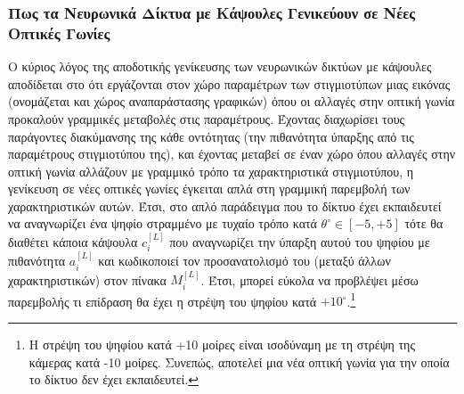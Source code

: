 \subsubsection{Πως τα Νευρωνικά Δίκτυα με Κάψουλες Γενικεύουν σε Νέες Οπτικές Γωνίες}
Ο κύριος λόγος της αποδοτικής γενίκευσης των νευρωνικών δικτύων με κάψουλες αποδίδεται στο ότι εργάζονται στον χώρο παραμέτρων των στιγμιοτύπων μιας εικόνας (ονομάζεται και χώρος αναπαράστασης γραφικών) όπου οι αλλαγές στην οπτική γωνία προκαλούν γραμμικές μεταβολές στις παραμέτρους. Έχοντας διαχωρίσει τους παράγοντες διακύμανσης της κάθε οντότητας (την πιθανότητα ύπαρξης από τις παραμέτρους στιγμιοτύπου της), και έχοντας μεταβεί σε έναν χώρο όπου αλλαγές στην οπτική γωνία αλλάζουν με γραμμικό τρόπο τα χαρακτηριστικά στιγμιοτύπου, η γενίκευση σε νέες οπτικές γωνίες έγκειται απλά στη γραμμική παρεμβολή των χαρακτηριστικών αυτών. Έτσι, στο απλό παράδειγμα που το δίκτυο έχει εκπαιδευτεί να αναγνωρίζει ένα ψηφίο στραμμένο με τυχαίο τρόπο κατά $\theta^\circ \in [-5,+5]$ τότε θα διαθέτει κάποια κάψουλα $c_i^{[L]}$ που αναγνωρίζει την ύπαρξη αυτού του ψηφίου με πιθανότητα $a_i^{[L]}$ και κωδικοποιεί τον προσανατολισμό του (μεταξύ άλλων χαρακτηριστικών) στον πίνακα $M_i^{[L]}$. Έτσι, μπορεί εύκολα να προβλέψει μέσω παρεμβολής τι επίδραση θα έχει η στρέψη του ψηφίου κατά $+10^\circ$.\footnote{Η στρέψη του ψηφίου κατά +10 μοίρες είναι ισοδύναμη με τη στρέψη της κάμερας κατά -10 μοίρες. Συνεπώς, αποτελεί μια νέα οπτική γωνία για την οποία το δίκτυο δεν έχει εκπαιδευτεί.}\par

